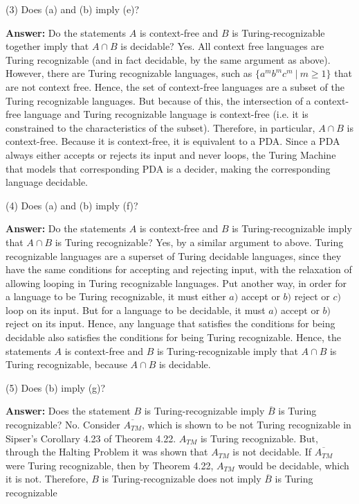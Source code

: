 \documentclass[11pt]{article}
\begin{document}
\begin{enumerate}[label=\textbf{Exercise \arabic{*}}]
        (3) Does (a) and (b) imply (e)?

        \textbf{Answer:} Do the statements $A$ is context-free and $B$ is Turing-recognizable together imply that $A \cap B$ is decidable? Yes. All context free languages are Turing recognizable (and in fact decidable, by the same argument as above). However, there are Turing recognizable languages, such as  $\{a^{m}b^{m}c^{m}\ \vert\ m \ge 1\}$ that are not context free. Hence, the set of context-free languages are a subset of the Turing recognizable languages. But because of this, the intersection of a context-free language and Turing recognizable language is context-free (i.e. it is constrained to the characteristics of the subset). Therefore, in particular, $A \cap B$ is context-free. Because it is context-free, it is equivalent to a PDA. Since a PDA always either accepts or rejects its input and never loops, the Turing Machine that models that corresponding PDA is a decider, making the corresponding language decidable.

        (4) Does (a) and (b) imply (f)?

        \textbf{Answer:} Do the statements $A$ is context-free and $B$ is Turing-recognizable imply that $A \cap B$ is Turing recognizable? Yes, by a similar argument to above. Turing recognizable languages are a superset of Turing decidable languages, since they have the same conditions for accepting and rejecting input, with the relaxation of allowing looping in Turing recognizable languages. Put another way, in order for a language to be Turing recognizable, it must either $a)$ accept or $b)$ reject or $c)$ loop on its input. But for a language to be decidable, it must $a)$ accept or $b)$ reject on its input. Hence, any language that satisfies the conditions for being decidable also satisfies the conditions for being Turing recognizable. Hence, the statements $A$ is context-free and $B$ is Turing-recognizable imply that $A \cap B$ is Turing recognizable, because $A \cap B$ is decidable.

        (5) Does (b) imply (g)?

        \textbf{Answer:} Does the statement $B$ is Turing-recognizable imply $\overline{B}$ is Turing recognizable? No. Consider $\overline{A_{TM}}$, which is shown to be not Turing recognizable in Sipser's Corollary 4.23 of Theorem 4.22. $A_{TM}$ is Turing recognizable. But, through the Halting Problem it was shown that $A_{TM}$ is not decidable. If $\overline{A_{TM}}$ were Turing recognizable, then by Theorem 4.22, $A_{TM}$ would be decidable, which it is not. Therefore, $B$ is Turing-recognizable does not imply $\overline{B}$ is Turing recognizable


\end{enumerate}
\end{document}
